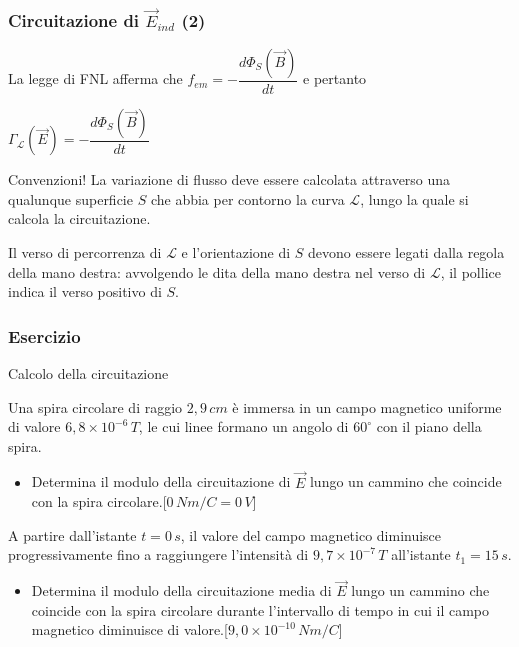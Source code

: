 \documentclass[]{beamer}
\theoremstyle{plain}
\newcommand{\fem}{f_{em}}
\begin{document}
\begin{frame}
\frametitle{Circuitazione di $ \vec{E}_{ind} $ (2)}
La legge di FNL afferma che $ \fem = - \dfrac{d\Phi_S(\vec{B})}{dt} $ e pertanto
\begin{center}
\colorbox{blue!30}{$ \Gamma_\mathscr{L} (\vec{E}) =  - \dfrac{d\Phi_S(\vec{B})}{dt}$}
\end{center}\pause


\begin{alertblock}{Convenzioni!}
La variazione di flusso deve essere calcolata attraverso una qualunque superficie $ S $ che abbia per contorno la curva $ \mathscr{L} $, lungo la quale si calcola la circuitazione.\pause

Il verso di percorrenza di $ \mathscr{L} $ e l'orientazione di $ S $ devono essere legati dalla regola della mano destra: avvolgendo le dita della mano destra nel verso di $ \mathscr{L} $, il pollice indica il verso positivo di $ S $.

\end{alertblock}
\end{frame}






\begin{frame}
\frametitle{Esercizio}
\begin{exampleblock}{Calcolo della circuitazione}
\small{
Una spira circolare di raggio $ 2,9 \, cm $ è immersa in un campo magnetico uniforme di valore $ 6,8 \times 10^{-6} \, T $, le cui linee formano un angolo di $ 60^\circ $ con il piano della spira.  
  \begin{itemize}
    \item Determina il modulo della circuitazione di $ \vec{E} $ lungo un cammino che coincide con la spira circolare.\hspace*{\fill}[$ 0 \, Nm/C = 0 \, V $]
  \end{itemize}
  A partire dall'istante $ t = 0 \, s $, il valore del campo magnetico diminuisce progressivamente fino a raggiungere l'intensità di $ 9,7 \times 10^{-7} \, T $ all'istante $ t_1 = 15 \, s $.
  \begin{itemize}
    \item Determina il modulo della circuitazione media di $ \vec{E} $ lungo un cammino che coincide con la spira circolare durante l'intervallo di tempo in cui il campo magnetico diminuisce di valore.\hspace*{\fill}[$ 9,0 \times 10^{-10} \, Nm/C $]
  \end{itemize}
  }
\end{exampleblock}
\end{frame}
\end{document}
